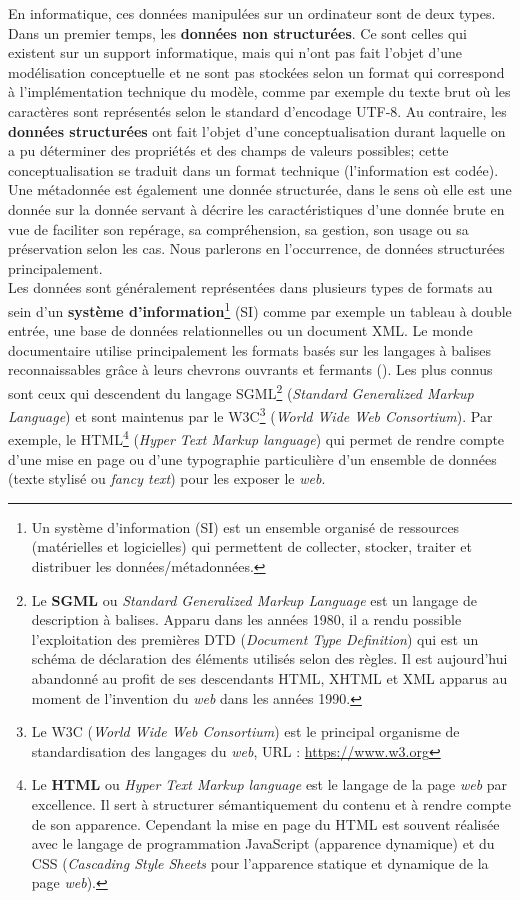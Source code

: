 En informatique, ces données manipulées sur un ordinateur sont de deux types. Dans un premier temps, les \textbf{données non structurées}. Ce sont celles qui existent sur un support informatique, mais qui n'ont pas fait l'objet d'une modélisation conceptuelle et ne sont pas stockées selon un format qui correspond à l'implémentation technique du modèle, comme par exemple du texte brut où les caractères sont représentés selon le standard d'encodage UTF-8. Au contraire, les \textbf{données structurées} ont fait l'objet d'une conceptualisation durant laquelle on a pu déterminer des propriétés et des champs de valeurs possibles; cette conceptualisation se traduit dans un format technique (l'information est codée). Une métadonnée est également une donnée structurée, dans le sens où elle est une donnée sur la donnée servant à décrire les caractéristiques d'une donnée brute en vue de faciliter son repérage, sa compréhension, sa gestion, son usage ou sa préservation selon les cas. Nous parlerons en l'occurrence, de données structurées principalement.\\

Les données sont généralement représentées dans plusieurs types de formats au sein d'un \textbf{système d'information}\footnote{Un système d'information (SI) est un ensemble organisé de ressources (matérielles et logicielles) qui permettent de collecter, stocker, traiter et distribuer les données/métadonnées.} (SI) comme par exemple un tableau à double entrée, une base de données relationnelles ou un document XML. Le monde documentaire utilise principalement les formats basés sur les langages à balises reconnaissables grâce à leurs chevrons ouvrants et fermants (\citecode{< >}). Les plus connus sont ceux qui descendent du langage SGML\footnote{Le \textbf{SGML} ou \textit{Standard Generalized Markup Language} est un langage de description à balises. Apparu dans les années 1980, il a rendu possible l'exploitation des premières DTD (\textit{Document Type Definition}) qui est un schéma de déclaration des éléments utilisés selon des règles. Il est aujourd'hui abandonné au profit de ses descendants HTML, XHTML et XML apparus au moment de l'invention du \textit{web} dans les années 1990.} (\textit{Standard Generalized Markup Language}) et sont maintenus par le W3C\footnote{Le W3C (\textit{World Wide Web Consortium}) est le principal organisme de standardisation des langages du \textit{web}, URL : \url{https://www.w3.org}} (\textit{World Wide Web Consortium}). Par exemple, le HTML\footnote{Le \textbf{HTML} ou \textit{Hyper Text Markup language} est le langage de la page \textit{web} par excellence. Il sert à structurer sémantiquement du contenu et à rendre compte de son apparence. Cependant la mise en page du HTML est souvent réalisée avec le langage de programmation JavaScript (apparence dynamique) et du CSS (\textit{Cascading Style Sheets} pour l'apparence statique et dynamique de la page \textit{web}).} (\textit{Hyper Text Markup language}) qui permet de rendre compte d'une mise en page ou d'une typographie particulière d'un ensemble de données (texte stylisé ou \textit{fancy text}) pour les exposer le \textit{web}.\\

